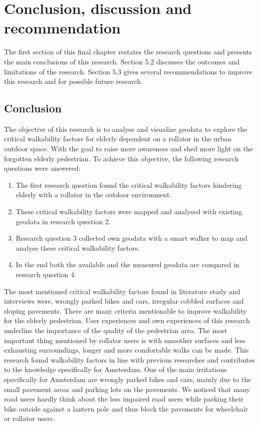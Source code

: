 \chapter{Conclusion, discussion and recommendation} 
The first section of this final chapter restates the research questions and presents the main conclusions of this research. Section 5.2 discusses the outcomes and limitations of the research. Section 5.3 gives several recommendations to improve this research and for possible future research.

\section{Conclusion} %
The objective of this research is to analyse and visualize geodata to explore the critical walkability factors for elderly dependent on a rollator in the urban outdoor space. With the goal to raise more awareness and shed more light on the forgotten elderly pedestrian. To achieve this objective, the following research questions were answered:

\begin{enumerate}
	\item The first research question found the critical walkability factors hindering elderly with a rollator in the outdoor environment.
	\item These critical walkability factors were mapped and analysed with existing geodata in research question 2. 
 	\item Research question 3 collected own geodata with a smart walker to map and analyse these critical walkability factors.
	\item In the end both the available and the measured geodata are compared in research question 4. 
\end{enumerate}

The most mentioned critical walkability factors found in literature study and interviews were, wrongly parked bikes and cars, irregular cobbled surfaces and sloping pavements. There are many criteria mentionable to improve walkability for the elderly pedestrian. User experiences and own experiences of this research underline the importance of the quality of the pedestrian area. The most important thing mentioned by rollator users is with smoother surfaces and less exhausting surroundings, longer and more comfortable walks can be made. This research found walkability factors in line with previous researches and contributes to the knowledge specifically for Amsterdam. One of the main irritations specifically for Amsterdam are wrongly parked bikes and cars, mainly due to the small pavement areas and parking lots on the pavements. We noticed that many road users hardly think about the less impaired road users while parking their bike outside against a lantern pole and thus block the pavements for wheelchair or rollator users.

